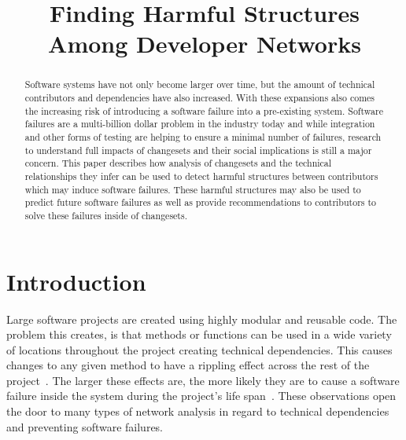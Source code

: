 \documentclass[conference]{IEEEtran}
\begin{document}
\title{Finding Harmful Structures Among Developer Networks}

\author{
}

\maketitle


\begin{abstract}
Software systems have not only become larger over time, but the amount of
technical contributors and dependencies have also increased. With these expansions also comes
the increasing risk of introducing a software failure into a pre-existing system.
Software failures are a multi-billion dollar problem in the industry today and while integration and
other forms of testing are helping to ensure a minimal number of failures, research to understand
full impacts of changesets and their social implications is still a major concern. This paper describes
how analysis of changesets and the technical relationships they infer can be used to detect harmful
structures between contributors which may induce software failures. These harmful structures may
also be used to predict future software failures as well as provide recommendations to contributors
to solve these failures inside of changesets.
\end{abstract}


\section{Introduction}

Large software projects are created using highly modular and 
reusable code. The problem this creates, is that methods or functions
can be used in a wide variety of locations throughout the project creating technical 
dependencies.  This causes changes to any given method to have a rippling 
effect across the rest of the project~\cite{Acharya:2011:PCI}. The larger these effects are,
the more likely they are to cause a software failure inside the system during the project's
life span~\cite{Zimmermann:2008:PDU}. These observations open the door to many types
of network analysis in regard to technical dependencies and preventing software failures.
\end{document}
